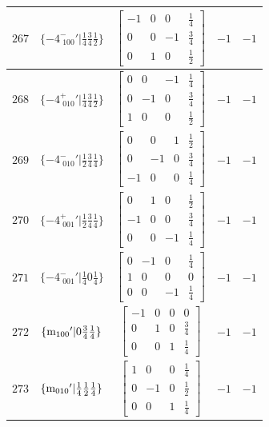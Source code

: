\documentclass[fleqn,8pt]{jsarticle}
\begin{document}
\begin{longtable}{ccccc}
$ 267 $ & $ \{-4^{-}_{\,\,100}{}'|\frac{1}{4} \frac{3}{4} \frac{1}{2}\} $ & $ \begin{bmatrix} -1 & 0 & 0 & \frac{1}{4} \\ 0 & 0 & -1 & \frac{3}{4} \\ 0 & 1 & 0 & \frac{1}{2} \end{bmatrix} $ & $ -1 $ & $ -1 $ \\ \hline
$ 268 $ & $ \{-4^{+}_{\,\,010}{}'|\frac{1}{4} \frac{3}{4} \frac{1}{2}\} $ & $ \begin{bmatrix} 0 & 0 & -1 & \frac{1}{4} \\ 0 & -1 & 0 & \frac{3}{4} \\ 1 & 0 & 0 & \frac{1}{2} \end{bmatrix} $ & $ -1 $ & $ -1 $ \\ \hline
$ 269 $ & $ \{-4^{-}_{\,\,010}{}'|\frac{1}{2} \frac{3}{4} \frac{1}{4}\} $ & $ \begin{bmatrix} 0 & 0 & 1 & \frac{1}{2} \\ 0 & -1 & 0 & \frac{3}{4} \\ -1 & 0 & 0 & \frac{1}{4} \end{bmatrix} $ & $ -1 $ & $ -1 $ \\ \hline
$ 270 $ & $ \{-4^{+}_{\,\,001}{}'|\frac{1}{2} \frac{3}{4} \frac{1}{4}\} $ & $ \begin{bmatrix} 0 & 1 & 0 & \frac{1}{2} \\ -1 & 0 & 0 & \frac{3}{4} \\ 0 & 0 & -1 & \frac{1}{4} \end{bmatrix} $ & $ -1 $ & $ -1 $ \\ \hline
$ 271 $ & $ \{-4^{-}_{\,\,001}{}'|\frac{1}{4} 0 \frac{1}{4}\} $ & $ \begin{bmatrix} 0 & -1 & 0 & \frac{1}{4} \\ 1 & 0 & 0 & 0 \\ 0 & 0 & -1 & \frac{1}{4} \end{bmatrix} $ & $ -1 $ & $ -1 $ \\ \hline
$ 272 $ & $ \{{\rm m}_{100}{}'|0 \frac{3}{4} \frac{1}{4}\} $ & $ \begin{bmatrix} -1 & 0 & 0 & 0 \\ 0 & 1 & 0 & \frac{3}{4} \\ 0 & 0 & 1 & \frac{1}{4} \end{bmatrix} $ & $ -1 $ & $ -1 $ \\ \hline
$ 273 $ & $ \{{\rm m}_{010}{}'|\frac{1}{4} \frac{1}{2} \frac{1}{4}\} $ & $ \begin{bmatrix} 1 & 0 & 0 & \frac{1}{4} \\ 0 & -1 & 0 & \frac{1}{2} \\ 0 & 0 & 1 & \frac{1}{4} \end{bmatrix} $ & $ -1 $ & $ -1 $ \\ \hline

\end{longtable}
\end{document}
